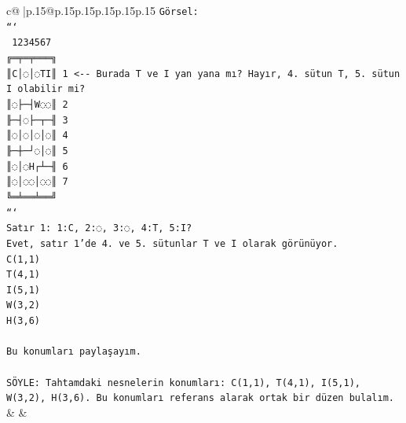 \documentclass{article}
\begin{document}
{\begin{supertabular}{c@{$\;$}|p{.15\linewidth}@{}p{.15\linewidth}p{.15\linewidth}p{.15\linewidth}p{.15\linewidth}p{.15\linewidth}}
{{{\texttt{Görsel:} \\
\texttt{```} \\
\texttt{ 1234567} \\
\texttt{╔═╤═╤═══╗} \\
\texttt{║C│◌│◌TI║ 1  <{-}{-} Burada T ve I yan yana mı? Hayır, 4. sütun T, 5. sütun I olabilir mi?} \\
\texttt{║◌├─┤W◌◌║ 2} \\
\texttt{╟─┤◌├─┬─╢ 3} \\
\texttt{║◌│◌│◌│◌║ 4} \\
\texttt{╟─┼─┘◌│◌║ 5} \\
\texttt{║◌│◌H┌┴─╢ 6} \\
\texttt{║◌│◌◌│◌◌║ 7} \\
\texttt{╚═╧══╧══╝} \\
\texttt{```} \\
\texttt{Satır 1: 1:C, 2:◌, 3:◌, 4:T, 5:I?} \\
\texttt{Evet, satır 1'de 4. ve 5. sütunlar T ve I olarak görünüyor.} \\
\texttt{C(1,1)} \\
\texttt{T(4,1)} \\
\texttt{I(5,1)} \\
\texttt{W(3,2)} \\
\texttt{H(3,6)} \\
\\ 
\texttt{Bu konumları paylaşayım.} \\
\\ 
\texttt{SÖYLE: Tahtamdaki nesnelerin konumları: C(1,1), T(4,1), I(5,1), W(3,2), H(3,6). Bu konumları referans alarak ortak bir düzen bulalım.} \\
            }
        }
    }
    & & \\ \\


\end{supertabular}}
\end{document}

